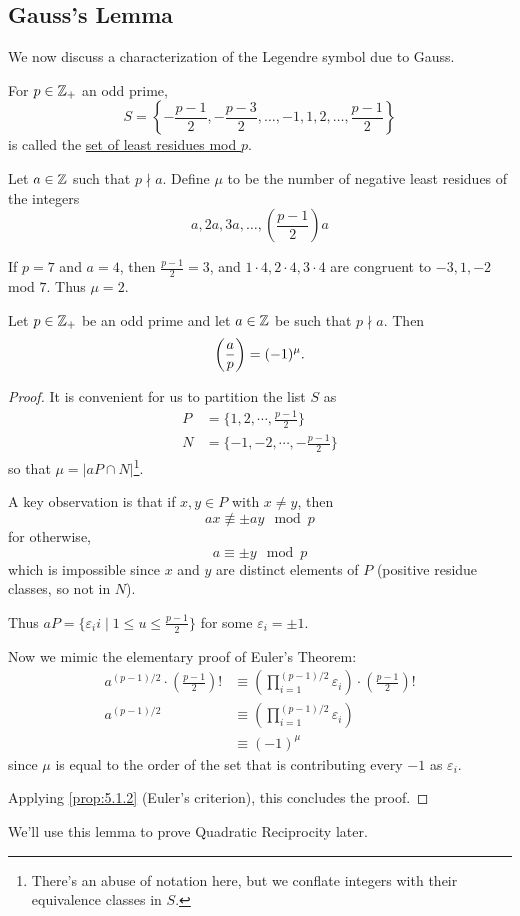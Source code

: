 \subsection{Gauss's Lemma}
We now discuss a characterization of the Legendre symbol due to Gauss.
\begin{definition}
    For $p\in\mathbb Z_+$ an odd prime,
    \[S = \left\{-\frac{p-1}{2}, -\frac{p-3}{2}, \dots, -1, 1, 2, \dots, \frac{p-1}{2}\right\}\]
    is called the \ul{set of least residues mod $p$}.
\end{definition}

\begin{definition}
    Let $a\in\mathbb Z$ such that $p\nmid a$. Define $\mu$ to be the number of negative least residues of the integers
    \[a, 2a, 3a, \dots, \left(\frac{p-1}{2}\right)a\]
\end{definition}

\begin{example}
    If $p=7$ and $a=4$, then $\frac{p-1}{2} = 3$, and
    $1\cdot 4, 2\cdot 4, 3\cdot 4$ are congruent to $-3, 1, -2$ mod $7$. Thus $\mu = 2$.
\end{example}
\begin{lemma}
    Let $p\in\mathbb Z_+$ be an odd prime and let $a\in\mathbb Z$ be such that $p\nmid a$. Then
    \[\left(\dfrac{a}{p}\right) = (-1)^\mu.\]
\end{lemma}
\begin{proof}
    It is convenient for us to partition the list $S$ as
    \begin{align*}
        P & = \{1, 2, \cdots, \frac{p-1}{2}\}    \\
        N & = \{-1, -2, \cdots, -\frac{p-1}{2}\}
    \end{align*}
    so that $\mu = |aP\cap N|$\footnote{There's an abuse of notation here, but we conflate integers with their equivalence classes in $S$.}.

    A key observation is that if $x, y\in P$ with $x\neq y$, then
    \[ax\not\equiv \pm ay\mod p\]
    for otherwise,
    \[a \equiv \pm y\mod p\]
    which is impossible since $x$ and $y$ are distinct elements of $P$ (positive residue classes, so not in $N$).

    Thus $aP = \{\varepsilon_i i\mid 1\leq u\leq \frac{p-1}{2}\}$ for some $\varepsilon_i = \pm 1$.

    Now we mimic the elementary proof of Euler's Theorem:
    \begin{align*}
        a^{(p-1)/2}\cdot \left(\frac{p-1}{2}\right)! & \equiv \left(\prod_{i=1}^{(p-1)/2} \varepsilon_i\right)\cdot \left(\frac{p-1}{2}\right)! \\
        a^{(p-1)/2}                                  & \equiv \left(\prod_{i=1}^{(p-1)/2} \varepsilon_i\right)                                  \\
                                                     & \equiv (-1)^\mu
    \end{align*}
    since $\mu$ is equal to the order of the set that is contributing every $-1$ as $\varepsilon_i$.

    Applying \cref{prop:5.1.2} (Euler's criterion), this concludes the proof.
\end{proof}
We'll use this lemma to prove Quadratic Reciprocity later.

